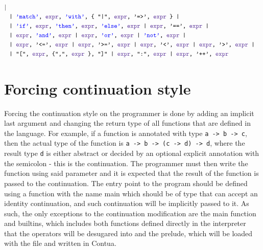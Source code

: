 \documentclass{article}
\begin{document}
\begin{align*}
{		|}\\
	&\texttt{
		| \color{blue}'match'\color{black}, \color{RoyalPurple}expr\color{black}, \color{blue}'with'\color{black}, \{ "|", \color{RoyalPurple}expr\color{black}, '=>', \color{RoyalPurple}expr \color{black} \}
		|}\\
	&\texttt{
		| \color{blue}'if'\color{black}, \color{RoyalPurple}expr\color{black}, \color{blue}'then'\color{black}, \color{RoyalPurple}expr\color{black}, \color{blue}'else'\color{black}, \color{RoyalPurple}expr \color{black}
		| \color{RoyalPurple}expr\color{black}, '==',
		\color{RoyalPurple}expr \color{black}
		|}\\
	&\texttt{
		| \color{RoyalPurple}expr\color{black}, \color{blue}'and'\color{black}, \color{RoyalPurple}expr \color{black}
		| \color{RoyalPurple}expr\color{black}, \color{blue} 'or'\color{black}, \color{RoyalPurple}expr \color{black}
		| \color{blue} 'not'\color{black}, \color{RoyalPurple}expr \color{black} 
		|}\\
	&\texttt{
		| \color{RoyalPurple}expr\color{black}, '<=', \color{RoyalPurple}expr \color{black}
		| \color{RoyalPurple}expr\color{black}, '>=', \color{RoyalPurple}expr \color{black}
		| \color{RoyalPurple}expr\color{black}, '<', \color{RoyalPurple}expr \color{black}
		| \color{RoyalPurple}expr\color{black}, '>', \color{RoyalPurple}expr \color{black}
		|}\\
	&\texttt{
		| "[", \color{RoyalPurple}expr\color{black}, \{",", \color{RoyalPurple}expr \color{black}\}, "]"
		| \color{RoyalPurple} expr\color{black}, ":", \color{RoyalPurple}expr \color{black}
		| \color{RoyalPurple}expr\color{black}, '++', \color{RoyalPurple}expr \color{black}
	}
	\end{align*}
	\section{Forcing continuation style}
	Forcing the continuation style on the programmer is done by adding an implicit last argument
	and changing the return type of all functions that are defined in the language.
	For example, if a function is annotated with type \texttt{a -> b -> c},
	then the actual type of the function is \texttt{a -> b -> (c -> d) -> d},
	where the result type \texttt{d} is either abstract or decided by an optional explicit annotation with the semicolon - this is the continuation.
	The programmer must then write the function using said parameter and it is expected that 
	the result of the function is passed to the continuation. The entry point to the program should be defined using a function with the name main which should be of type that can accept an identity continuation, and such continuation will be implicitly passed to it.
	As such, the only exceptions to the continuation modification are the main function and builtins, which includes both functions defined directly in the interpreter that the operators will be desugared into and the prelude, which will be loaded with the file and written in Contua.
	
\end{document}
